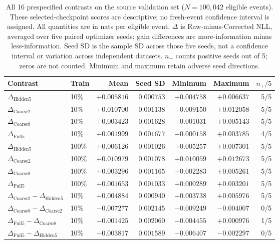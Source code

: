 \begin{table}[!htbp]
\centering
\small
\setlength{\tabcolsep}{3pt}
\caption{All 16 prespecified contrasts on the source validation set ($N=100,042$ eligible events). These selected-checkpoint scores are descriptive; no fresh-event confidence interval is assigned. All quantities are in nats per eligible event. $\Delta$ is Raw-minus-Corrected NLL, averaged over five paired optimizer seeds; gain differences are more-information minus less-information. Seed SD is the sample SD across those five seeds, not a confidence interval or variation across independent datasets. $n_+$ counts positive seeds out of 5; zeros are not counted. Minimum and maximum retain adverse seed directions.}
\label{tab:information-source16}
\begin{tabular}{llrrrrr}
\toprule
Contrast & Train & Mean & Seed SD & Minimum & Maximum & $n_+/5$ \\
\midrule
$\Delta_{\mathrm{Hidden5}}$ & 10\% & $+0.005816$ & $0.000753$ & $+0.004758$ & $+0.006637$ & 5/5 \\
$\Delta_{\mathrm{Coarse2}}$ & 10\% & $+0.010700$ & $0.001138$ & $+0.009150$ & $+0.012058$ & 5/5 \\
$\Delta_{\mathrm{Coarse8}}$ & 10\% & $+0.003423$ & $0.001628$ & $+0.001031$ & $+0.005143$ & 5/5 \\
$\Delta_{\mathrm{Full5}}$ & 10\% & $+0.001999$ & $0.001677$ & $-0.000158$ & $+0.003785$ & 4/5 \\
\midrule
$\Delta_{\mathrm{Hidden5}}$ & 100\% & $+0.006126$ & $0.001026$ & $+0.005257$ & $+0.007301$ & 5/5 \\
$\Delta_{\mathrm{Coarse2}}$ & 100\% & $+0.010979$ & $0.001078$ & $+0.010059$ & $+0.012673$ & 5/5 \\
$\Delta_{\mathrm{Coarse8}}$ & 100\% & $+0.003296$ & $0.001165$ & $+0.002283$ & $+0.005261$ & 5/5 \\
$\Delta_{\mathrm{Full5}}$ & 100\% & $+0.001653$ & $0.001033$ & $+0.000289$ & $+0.003201$ & 5/5 \\
\midrule
$\Delta_{\mathrm{Coarse2}}-\Delta_{\mathrm{Hidden5}}$ & 10\% & $+0.004884$ & $0.000940$ & $+0.003738$ & $+0.005976$ & 5/5 \\
$\Delta_{\mathrm{Coarse8}}-\Delta_{\mathrm{Coarse2}}$ & 10\% & $-0.007277$ & $0.002145$ & $-0.009249$ & $-0.004007$ & 0/5 \\
$\Delta_{\mathrm{Full5}}-\Delta_{\mathrm{Coarse8}}$ & 10\% & $-0.001425$ & $0.002060$ & $-0.004455$ & $+0.000976$ & 1/5 \\
$\Delta_{\mathrm{Full5}}-\Delta_{\mathrm{Hidden5}}$ & 10\% & $-0.003817$ & $0.001589$ & $-0.006407$ & $-0.002297$ & 0/5 \\

\end{tabular}
\end{table}
